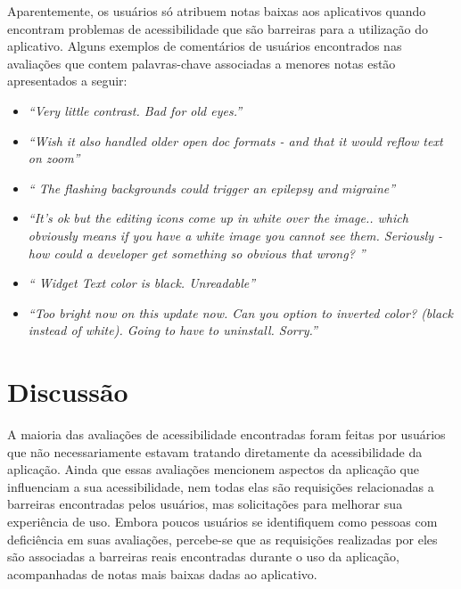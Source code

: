Aparentemente, os usuários só atribuem notas baixas aos aplicativos quando encontram problemas de acessibilidade que são barreiras para a utilização do aplicativo. 
Alguns exemplos de comentários de usuários encontrados nas avaliações que contem palavras-chave associadas a menores notas estão apresentados a seguir:
\begin{itemize}
 \item \textit{``Very little contrast. Bad for old eyes.''}
 \item \textit{``Wish it also handled older open doc formats - and that it would reflow text on zoom''}
 \item \textit{`` The flashing backgrounds could trigger an epilepsy and migraine''}
 \item \textit{``It's ok but the editing icons come up in white over the image.. which obviously means if you have a white image you cannot see them. Seriously - how could a developer get something so obvious that wrong? ''}
 \item \textit{`` Widget Text color is black. Unreadable''}
 \item \textit{``Too bright now on this update now. Can you option to inverted color? (black instead of white). Going to have to uninstall. Sorry.''}  
\end{itemize}



\section{Discussão}

A maioria das avaliações de acessibilidade encontradas foram feitas por usuários que não necessariamente estavam tratando diretamente da acessibilidade da aplicação. Ainda que essas avaliações mencionem aspectos da aplicação que influenciam a sua acessibilidade, nem todas elas são requisições relacionadas a barreiras encontradas pelos usuários, mas solicitações para melhorar sua experiência de uso. 
Embora poucos usuários se identifiquem como pessoas com deficiência em suas avaliações, percebe-se que as requisições realizadas por eles são associadas a barreiras reais encontradas durante o uso da aplicação, acompanhadas de notas mais baixas dadas ao aplicativo. 

